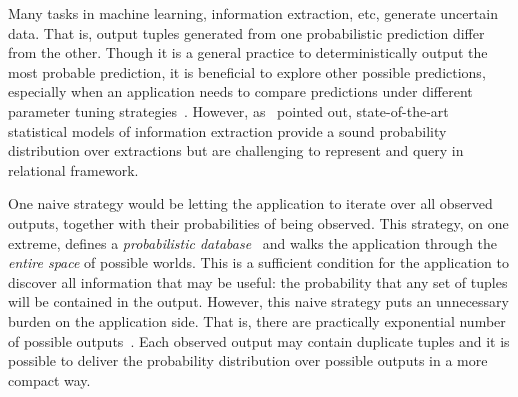 Many tasks in machine learning, information extraction, etc, generate uncertain data.
That is, output tuples generated from one probabilistic prediction differ from the other.
Though it is a general practice to deterministically output the most probable prediction, it is beneficial to explore other possible predictions, especially when an application needs to compare predictions under different parameter tuning strategies~\cite{papadakis2016comparative}.
However, as~\cite{Gupta:2006:CPD:1182635.1164210} pointed out, state-of-the-art statistical models of information extraction provide a sound probability distribution over extractions but are challenging to represent and query in relational framework.

One naive strategy would be letting the application to iterate over all observed outputs, together with their probabilities of being observed.
This strategy, on one extreme, defines a \emph{probabilistic database}~\cite{suciu2009probabilistic} and walks the application through the \emph{entire space} of possible worlds.
This is a sufficient condition for the application to discover all information that may be useful: the probability that any set of tuples will be contained in the output.
However, this naive strategy puts an unnecessary burden on the application side.
That is, there are practically exponential number of possible outputs~\cite{Gupta:2006:CPD:1182635.1164210}.  
Each observed output may contain duplicate tuples and it is possible to deliver the probability distribution over possible outputs in a more compact way.

